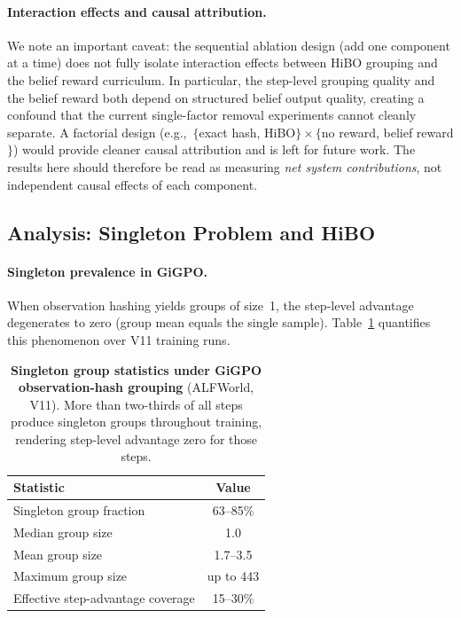 \paragraph{Interaction effects and causal attribution.}
We note an important caveat: the sequential ablation design (add one component
at a time) does not fully isolate interaction effects between HiBO grouping and
the belief reward curriculum.
In particular, the step-level grouping quality and the belief reward both depend
on structured belief output quality, creating a confound that the current single-factor
removal experiments cannot cleanly separate.
A factorial design (e.g.,~$\{$exact hash, HiBO$\} \times \{$no reward, belief reward$\}$)
would provide cleaner causal attribution and is left for future work.
The results here should therefore be read as measuring \emph{net system contributions},
not independent causal effects of each component.


\subsection{Analysis: Singleton Problem and HiBO}
\label{sec:hibo_analysis}

\paragraph{Singleton prevalence in GiGPO.}
When observation hashing yields groups of size~1, the step-level advantage
degenerates to zero (group mean equals the single sample).
Table~\ref{tab:singleton} quantifies this phenomenon over V11 training runs.

\begin{table}[t]
  \centering
  \caption{%
    \textbf{Singleton group statistics under GiGPO observation-hash grouping}
    (ALFWorld, V11).
    More than two-thirds of all steps produce singleton groups throughout training,
    rendering step-level advantage zero for those steps.
  }
  \label{tab:singleton}
  \vspace{4pt}
  \small
  \renewcommand{\arraystretch}{1.15}
  \begin{tabular}{@{}lc@{}}
    \toprule
    \textbf{Statistic} & \textbf{Value} \\
    \midrule
    Singleton group fraction         & 63--85\%   \\
    Median group size                & 1.0        \\
    Mean group size                  & 1.7--3.5   \\
    Maximum group size               & up to 443  \\
    Effective step-advantage coverage & 15--30\%  \\
    \bottomrule
  \end{tabular}
\end{table}


